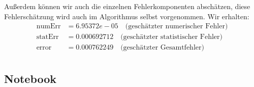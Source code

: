Außerdem können wir auch die einzelnen Fehlerkomponenten abschätzen, diese Fehlerschätzung wird auch im Algorithmus selbst vorgenommen. Wir erhalten: 
\begin{align*}
\text{numErr}  &= 6.95372e-05   \quad \text{(geschätzter numerischer Fehler)}\\
\text{statErr} &= 0.000692712  \quad  \text{(geschätzter statistischer Fehler)}\\
\text{error}   &= 0.000762249  \quad  \text{(geschätzter Gesamtfehler)}\\
\end{align*}



\subsection{Notebook}


